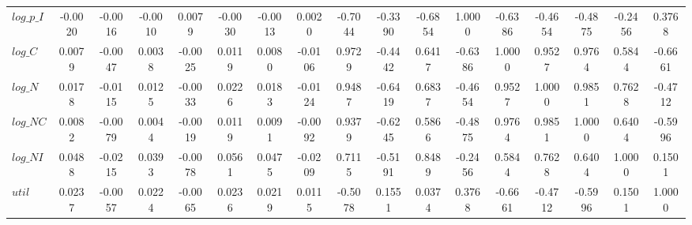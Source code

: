 \begin{center}
\begin{longtable}{lcccccccccccccccc}
$log\_p\_I       $	 & 	           -0.0020	 & 	           -0.0016	 & 	           -0.0010	 & 	            0.0079	 & 	           -0.0030	 & 	           -0.0013	 & 	            0.0020	 & 	           -0.7044	 & 	           -0.3390	 & 	           -0.6854	 & 	            1.0000	 & 	           -0.6386	 & 	           -0.4654	 & 	           -0.4875	 & 	           -0.2456	 & 	            0.3768 \\ 
$log\_C          $	 & 	            0.0079	 & 	           -0.0047	 & 	            0.0038	 & 	           -0.0025	 & 	            0.0119	 & 	            0.0080	 & 	           -0.0106	 & 	            0.9729	 & 	           -0.4442	 & 	            0.6417	 & 	           -0.6386	 & 	            1.0000	 & 	            0.9527	 & 	            0.9764	 & 	            0.5844	 & 	           -0.6661 \\ 
$log\_N          $	 & 	            0.0178	 & 	           -0.0115	 & 	            0.0125	 & 	           -0.0033	 & 	            0.0226	 & 	            0.0183	 & 	           -0.0124	 & 	            0.9487	 & 	           -0.6419	 & 	            0.6837	 & 	           -0.4654	 & 	            0.9527	 & 	            1.0000	 & 	            0.9851	 & 	            0.7628	 & 	           -0.4712 \\ 
$log\_NC         $	 & 	            0.0082	 & 	           -0.0079	 & 	            0.0044	 & 	           -0.0019	 & 	            0.0119	 & 	            0.0091	 & 	           -0.0092	 & 	            0.9379	 & 	           -0.6245	 & 	            0.5866	 & 	           -0.4875	 & 	            0.9764	 & 	            0.9851	 & 	            1.0000	 & 	            0.6404	 & 	           -0.5996 \\ 
$log\_NI         $	 & 	            0.0488	 & 	           -0.0215	 & 	            0.0393	 & 	           -0.0078	 & 	            0.0561	 & 	            0.0475	 & 	           -0.0209	 & 	            0.7115	 & 	           -0.5191	 & 	            0.8489	 & 	           -0.2456	 & 	            0.5844	 & 	            0.7628	 & 	            0.6404	 & 	            1.0000	 & 	            0.1501 \\ 
${util}          $	 & 	            0.0237	 & 	           -0.0057	 & 	            0.0224	 & 	           -0.0065	 & 	            0.0236	 & 	            0.0219	 & 	            0.0115	 & 	           -0.5078	 & 	            0.1551	 & 	            0.0374	 & 	            0.3768	 & 	           -0.6661	 & 	           -0.4712	 & 	           -0.5996	 & 	            0.1501	 & 	            1.0000 \\ 
\end{longtable}
 \end{center}
